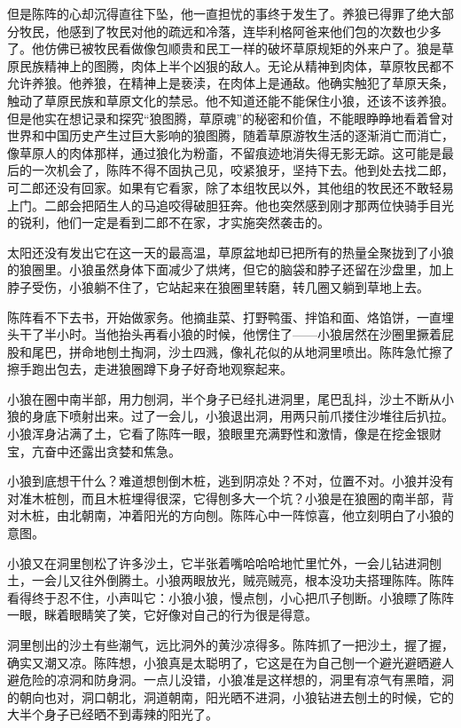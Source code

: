 \par 但是陈阵的心却沉得直往下坠，他一直担忧的事终于发生了。养狼已得罪了绝大部分牧民，他感到了牧民对他的疏远和冷落，连毕利格阿爸来他们包的次数也少多了。他仿佛已被牧民看做像包顺贵和民工一样的破坏草原规矩的外来户了。狼是草原民族精神上的图腾，肉体上半个凶狠的敌人。无论从精神到肉体，草原牧民都不允许养狼。他养狼，在精神上是亵渎，在肉体上是通敌。他确实触犯了草原天条，触动了草原民族和草原文化的禁忌。他不知道还能不能保住小狼，还该不该养狼。但是他实在想记录和探究“狼图腾，草原魂”的秘密和价值，不能眼睁睁地看着曾对世界和中国历史产生过巨大影响的狼图腾，随着草原游牧生活的逐渐消亡而消亡，像草原人的肉体那样，通过狼化为粉齑，不留痕迹地消失得无影无踪。这可能是最后的一次机会了，陈阵不得不固执己见，咬紧狼牙，坚持下去。他到处去找二郎，可二郎还没有回家。如果有它看家，除了本组牧民以外，其他组的牧民还不敢轻易上门。二郎会把陌生人的马追咬得破胆狂奔。他也突然感到刚才那两位快骑手目光的锐利，他们一定是看到二郎不在家，才实施突然袭击的。
\par 太阳还没有发出它在这一天的最高温，草原盆地却已把所有的热量全聚拢到了小狼的狼圈里。小狼虽然身体下面减少了烘烤，但它的脑袋和脖子还留在沙盘里，加上脖子受伤，小狼躺不住了，它站起来在狼圈里转磨，转几圈又躺到草地上去。
\par 陈阵看不下去书，开始做家务。他摘韭菜、打野鸭蛋、拌馅和面、烙馅饼，一直埋头干了半小时。当他抬头再看小狼的时候，他愣住了——小狼居然在沙圈里撅着屁股和尾巴，拼命地刨土掏洞，沙土四溅，像礼花似的从地洞里喷出。陈阵急忙擦了擦手跑出包去，走进狼圈蹲下身子好奇地观察起来。
\par 小狼在圈中南半部，用力刨洞，半个身子已经扎进洞里，尾巴乱抖，沙土不断从小狼的身底下喷射出来。过了一会儿，小狼退出洞，用两只前爪搂住沙堆往后扒拉。小狼浑身沾满了土，它看了陈阵一眼，狼眼里充满野性和激情，像是在挖金银财宝，亢奋中还露出贪婪和焦急。
\par 小狼到底想干什么？难道想刨倒木桩，逃到阴凉处？不对，位置不对。小狼并没有对准木桩刨，而且木桩埋得很深，它得刨多大一个坑？小狼是在狼圈的南半部，背对木桩，由北朝南，冲着阳光的方向刨。陈阵心中一阵惊喜，他立刻明白了小狼的意图。
\par 小狼又在洞里刨松了许多沙土，它半张着嘴哈哈哈地忙里忙外，一会儿钻进洞刨土，一会儿又往外倒腾土。小狼两眼放光，贼亮贼亮，根本没功夫搭理陈阵。陈阵看得终于忍不住，小声叫它：小狼小狼，慢点刨，小心把爪子刨断。小狼瞟了陈阵一眼，眯着眼睛笑了笑，它好像对自己的行为很是得意。
\par 洞里刨出的沙土有些潮气，远比洞外的黄沙凉得多。陈阵抓了一把沙土，握了握，确实又潮又凉。陈阵想，小狼真是太聪明了，它这是在为自己刨一个避光避晒避人避危险的凉洞和防身洞。一点儿没错，小狼准是这样想的，洞里有凉气有黑暗，洞的朝向也对，洞口朝北，洞道朝南，阳光晒不进洞，小狼钻进去刨土的时候，它的大半个身子已经晒不到毒辣的阳光了。
